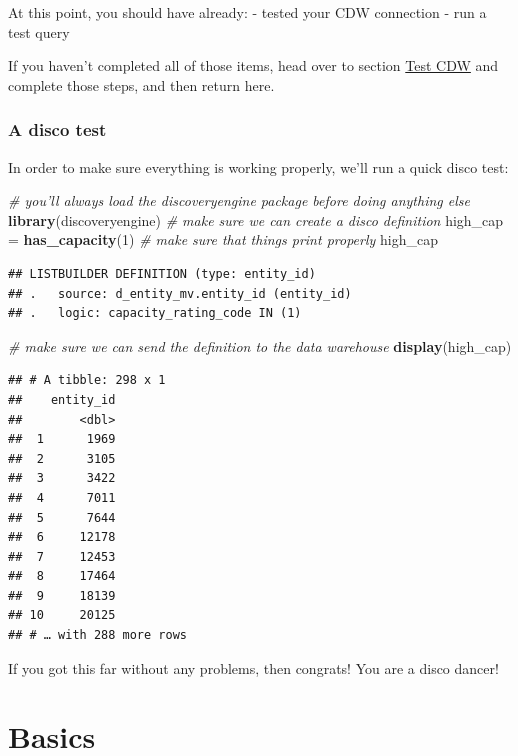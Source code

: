 \documentclass[]{book}
\newenvironment{Shaded}{\begin{snugshade}}{\end{snugshade}}
\newcommand{\CommentTok}[1]{\textcolor[rgb]{0.56,0.35,0.01}{\textit{#1}}}
\newcommand{\DecValTok}[1]{\textcolor[rgb]{0.00,0.00,0.81}{#1}}
\newcommand{\KeywordTok}[1]{\textcolor[rgb]{0.13,0.29,0.53}{\textbf{#1}}}
\newcommand{\NormalTok}[1]{#1}
\newcommand{\StringTok}[1]{\textcolor[rgb]{0.31,0.60,0.02}{#1}}
\begin{document}
At this point, you should have already:
- tested your CDW connection
- run a test query

If you haven't completed all of those items, head over to section \protect\hyperlink{test-cdw}{Test CDW} and complete those steps, and then return here.

\hypertarget{a-disco-test}{%
\section{A disco test}\label{a-disco-test}}

In order to make sure everything is working properly, we'll run a quick disco test:

\begin{Shaded}
\begin{Highlighting}[]
\CommentTok{# you'll always load the discoveryengine package before doing anything else}
\KeywordTok{library}\NormalTok{(discoveryengine)}
\CommentTok{# make sure we can create a disco definition}
\NormalTok{high_cap =}\StringTok{ }\KeywordTok{has_capacity}\NormalTok{(}\DecValTok{1}\NormalTok{)}
\CommentTok{# make sure that things print properly}
\NormalTok{high_cap}
\end{Highlighting}
\end{Shaded}

\begin{verbatim}
## LISTBUILDER DEFINITION (type: entity_id)
## .   source: d_entity_mv.entity_id (entity_id)
## .   logic: capacity_rating_code IN (1)
\end{verbatim}

\begin{Shaded}
\begin{Highlighting}[]
\CommentTok{# make sure we can send the definition to the data warehouse}
\KeywordTok{display}\NormalTok{(high_cap)}
\end{Highlighting}
\end{Shaded}

\begin{verbatim}
## # A tibble: 298 x 1
##    entity_id
##        <dbl>
##  1      1969
##  2      3105
##  3      3422
##  4      7011
##  5      7644
##  6     12178
##  7     12453
##  8     17464
##  9     18139
## 10     20125
## # … with 288 more rows
\end{verbatim}

If you got this far without any problems, then congrats! You are a disco dancer!

\hypertarget{part-basics}{%
\part{Basics}\label{part-basics}}
\end{document}
